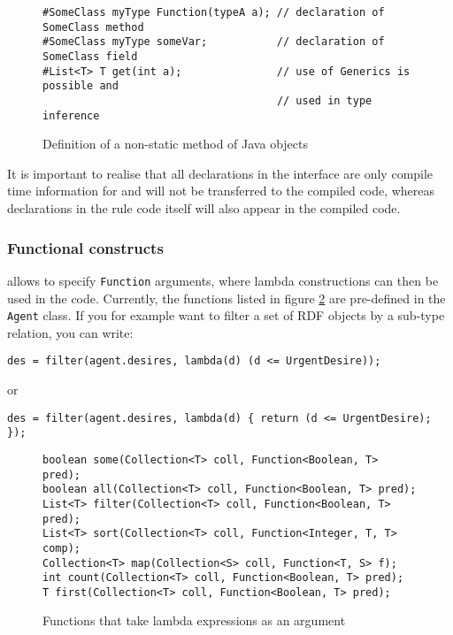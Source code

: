 \begin{figure}[htbp]
\centering
\small
\begin{lstlisting}
#SomeClass myType Function(typeA a); // declaration of SomeClass method
#SomeClass myType someVar;           // declaration of SomeClass field
#List<T> T get(int a);               // use of Generics is possible and
                                     // used in type inference
\end{lstlisting}\vspace*{-2ex}
\caption{\label{tab:methoddef}Definition of a non-static method of Java objects}
\end{figure}

It is important to realise that all declarations in the interface are only
compile time information for \vonda and will not be transferred to the compiled
code, whereas declarations in the rule code itself will also appear in the
compiled code.

\subsubsection{Functional constructs}

\vonda allows to specify \texttt{Function} arguments, where lambda
constructions can then be used in the code. Currently, the functions listed in
figure \ref{tab:lambda-functions} are pre-defined in the \texttt{Agent} class.
If you for example want to filter a set of RDF objects by a sub-type relation,
you can write:
{\small\begin{lstlisting}
des = filter(agent.desires, lambda(d) (d <= UrgentDesire));
\end{lstlisting}}
or
{\small\begin{lstlisting}
des = filter(agent.desires, lambda(d) { return (d <= UrgentDesire); });
\end{lstlisting}}

\begin{figure}[htbp]
\small%
\begin{lstlisting}
boolean some(Collection<T> coll, Function<Boolean, T> pred);
boolean all(Collection<T> coll, Function<Boolean, T> pred);
List<T> filter(Collection<T> coll, Function<Boolean, T> pred);
List<T> sort(Collection<T> coll, Function<Integer, T, T> comp);
Collection<T> map(Collection<S> coll, Function<T, S> f);
int count(Collection<T> coll, Function<Boolean, T> pred);
T first(Collection<T> coll, Function<Boolean, T> pred);
\end{lstlisting}\vspace*{-2ex}
\caption{\label{tab:lambda-functions}Functions that take lambda expressions as an argument}
\end{figure}


